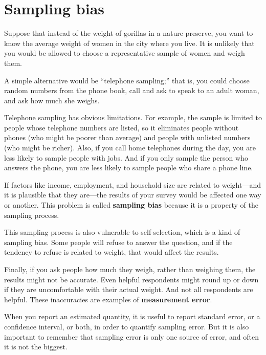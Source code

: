 \documentclass[12pt]{book}
\begin{document}
\section{Sampling bias}

Suppose that instead of the weight of gorillas in a nature preserve,
you want to know the average weight of women in the city where you
live.  It is unlikely that you would be allowed
to choose a representative sample of women and
weigh them.

A simple alternative would be
``telephone sampling;'' that is,
you could choose random numbers from the phone book, call and ask to
speak to an adult woman, and ask how much she weighs.

Telephone sampling has obvious limitations.  For example, the sample
is limited to people whose telephone numbers are listed, so it
eliminates people without phones (who might be poorer than average)
and people with unlisted numbers (who might be richer).  Also, if you
call home telephones during the day, you are less likely to sample
people with jobs.  And if you only sample the person who answers the
phone, you are less likely to sample people who share a phone line.

If factors like income, employment, and household size are related
to weight---and it is plausible that they are---the results of your
survey would be affected one way or another.  This problem is
called {\bf sampling bias} because it is a property of the sampling
process.

This sampling process is also vulnerable to self-selection, which is a
kind of sampling bias.  Some people will refuse to answer the
question, and if the tendency to refuse is related to weight, that
would affect the results.

Finally, if you ask people how much they weigh, rather than weighing
them, the results might not be accurate.  Even helpful respondents
might round up or down if they are uncomfortable with their actual
weight.  And not all respondents are helpful.  These inaccuracies are
examples of {\bf measurement error}.

When you report an estimated quantity, it is useful to report
standard error, or a confidence interval, or both, in order to
quantify sampling error.  But it is also important to remember that
sampling error is only one source of error, and often it is not the
biggest.
\end{document}
